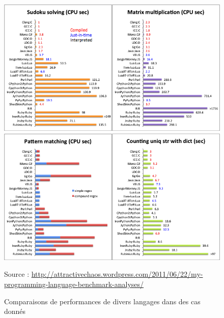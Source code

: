\documentclass[a4paper]{memoir}
\begin{document}
			\begin{figure}
				\begin{center}
					\includegraphics[scale=0.5]{img/AnalyseLangage1.png}
					\includegraphics[scale=0.5]{img/AnalyseLangage2.png} 
				\end{center}
				\label{fig:analyse}
				\caption{Comparaisons de performances de divers langages dans des cas donnés}
				Source : \url{http://attractivechaos.wordpress.com/2011/06/22/my-programming-language-benchmark-analyses/}
			\end{figure}
\end{document}
